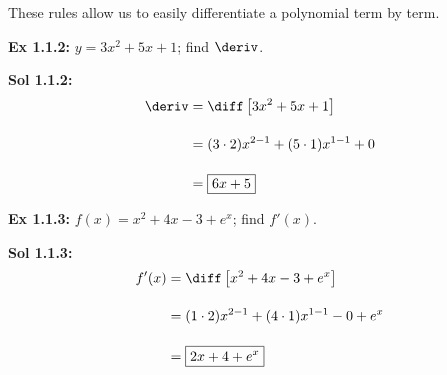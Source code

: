 \begin{center}
\end{center}

These rules allow us to easily differentiate a polynomial term by term.

\begin{tcolorbox}[example]
    \textbf{Ex 1.1.2: } $y = 3x^2 + 5x + 1$; find $\deriv$. 
\end{tcolorbox}
\begin{tcolorbox}[solution]
    \textbf{Sol 1.1.2: } \begin{align*}
        \deriv & = \diff \left[3x^2 + 5x + 1\right] \\[11pt]
        & = (3 \cdot 2)x^{2 - 1} + (5 \cdot 1)x^{1 - 1} + 0 \\[11pt]
        & = \boxed{6x + 5} 
    \end{align*}
\end{tcolorbox} \vspace{11pt}

\begin{tcolorbox}[example]
    \textbf{Ex 1.1.3: } $f(x) = x^2 + 4x - 3 + e^x$; find $f'(x)$. 
\end{tcolorbox}
\begin{tcolorbox}[solution]
    \textbf{Sol 1.1.3: } \begin{align*}
        f'(x) & = \diff \left[x^2 + 4x - 3 + e^x\right] \\[11pt]
        & = (1 \cdot 2)x^{2 - 1} + (4 \cdot 1)x^{1 - 1} - 0 + e^x \\[11pt]
        & = \boxed{2x + 4 + e^x} 
    \end{align*}
\end{tcolorbox} \vspace{11pt}

